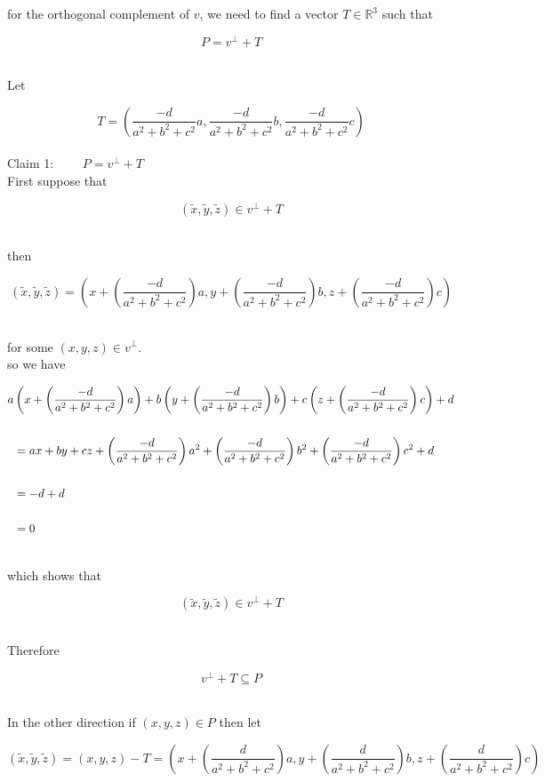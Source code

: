 \documentclass[12pt,letterpaper]{hmcpset}
\begin{document}
\begin{solution}
for the orthogonal complement of $v$,  we need to find a vector $T \in \mathbb{R}^3$ such that

\[ P = v^{\bot} + T \]\

Let

\[ T = (\frac{-d}{a^2+b^2+c^2} a, \frac{-d}{a^2+b^2+c^2} b, \frac{-d}{a^2+b^2+c^2} c)\]\\


{\large Claim 1: $\quad\quad P = v^{\bot}+T$}\\

First suppose that

\[(\tilde{x},\tilde{y},\tilde{z}) \in v^{\bot} + T\]\

then

\[   (\tilde{x},\tilde{y},\tilde{z}) = (x+ \left(\frac{-d}{a^2+b^2+c^2}\right) a, y+ \left(\frac{-d}{a^2+b^2+c^2} \right) b, z + \left(\frac{-d}{a^2+b^2+c^2}\right) c)\]\

for some $(x,y,z) \in v^{\bot}$.\\

so we have 

\begin{align}
a&\left(x+ \left(\frac{-d}{a^2+b^2+c^2}\right) a\right) + b\left(y+ \left(\frac{-d}{a^2+b^2+c^2}\right) b\right) + c\left(z+ \left(\frac{-d}{a^2+b^2+c^2}\right) c\right) +d \notag\\
&\quad\notag\\
&= ax+by+cz +\left(\frac{-d}{a^2+b^2+c^2}\right) a^2 +\left(\frac{-d}{a^2+b^2+c^2}\right) b^2 +\left(\frac{-d}{a^2+b^2+c^2}\right) c^2 +d \notag\\
&\quad\notag\\
&= -d + d\notag\\
&\notag\\
&= 0\notag\\
\notag
\end{align}

\newpage

which shows that

\[(\tilde{x},\tilde{y},\tilde{z}) \in v^{\bot} + T\]\

Therefore

\[v^{\bot} + T \subseteq P\]\

In the other direction if $(x,y,z) \in P$ then let

\[ (\tilde{x},\tilde{y},\tilde{z}) = (x,y,z) -T =  (x+ \left(\frac{d}{a^2+b^2+c^2}\right) a, y+ \left(\frac{d}{a^2+b^2+c^2} \right) b, z + \left(\frac{d}{a^2+b^2+c^2}\right) c)\]\


\end{solution}
\end{document}
